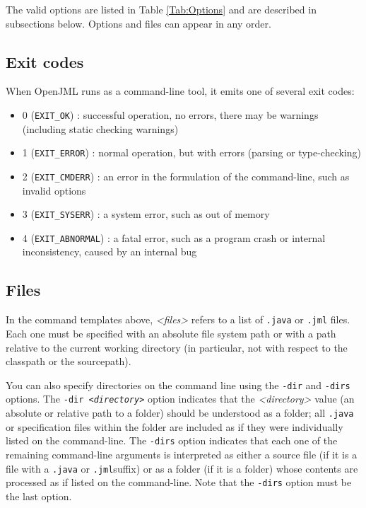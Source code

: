 The valid options are listed in Table \ref{Tab:Options} and are described in subsections below. Options and files can appear in any order.

\subsection{Exit codes}

When OpenJML runs as a command-line tool, it emits one of several exit codes:
\begin{itemize}[noitemsep,nolistsep]
\item 0 (\texttt{EXIT\_OK}) : successful operation, no errors, there may be warnings (including static checking warnings)
\item 1 (\texttt{EXIT\_ERROR}) : normal operation, but with errors (parsing or type-checking)
\item 2 (\texttt{EXIT\_CMDERR}) : an error in the formulation of the command-line, such as invalid options
\item 3 (\texttt{EXIT\_SYSERR}) : a system error, such as out of memory
\item 4 (\texttt{EXIT\_ABNORMAL}) : a fatal error, such as a program crash or internal inconsistency, caused by an internal bug
\end{itemize}

\subsection{Files}

In the command templates above, {\it <files>} refers to a list of {\tt .java} or {\tt .jml} files.
Each one must be specified with an absolute file system path or with a path relative
to the current working directory (in particular, not with respect to the classpath or
the sourcepath). 

You can also specify directories on the command line using the {\tt -dir} and {\tt -dirs} options.
The {\tt -dir {\it <directory>}} option indicates that the {\it <directory>} value (an absolute or
relative path to a folder) should be understood as a folder; all {\tt .java} or specification files
within the folder are included as if they were individually listed on the command-line. The
{\tt -dirs} option indicates that each one of the remaining command-line arguments is interpreted as 
either a source file (if it is a file with a {\tt .java} or {\tt .jml}suffix) or as a folder (if it is a folder)
whose contents are processed as if listed on the command-line. Note that the {\tt -dirs} option must be
the last option.

